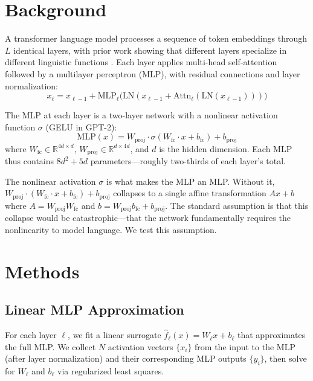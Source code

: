 \documentclass[11pt]{article}
\begin{document}
\section{Background}

A transformer language model processes a sequence of token embeddings through $L$ identical layers, with prior work showing that different layers specialize in different linguistic functions \citep{tenney2019}. Each layer applies multi-head self-attention followed by a multilayer perceptron (MLP), with residual connections and layer normalization:
\begin{equation}
x_\ell = x_{\ell-1} + \mathrm{MLP}_\ell\!\bigl(\mathrm{LN}(x_{\ell-1} + \mathrm{Attn}_\ell(\mathrm{LN}(x_{\ell-1})))\bigr)
\end{equation}

The MLP at each layer is a two-layer network with a nonlinear activation function $\sigma$ (GELU in GPT-2):
\begin{equation}
\mathrm{MLP}(x) = W_{\mathrm{proj}} \cdot \sigma(W_{\mathrm{fc}} \cdot x + b_{\mathrm{fc}}) + b_{\mathrm{proj}}
\end{equation}
where $W_{\mathrm{fc}} \in \mathbb{R}^{4d \times d}$, $W_{\mathrm{proj}} \in \mathbb{R}^{d \times 4d}$, and $d$ is the hidden dimension. Each MLP thus contains $8d^2 + 5d$ parameters---roughly two-thirds of each layer's total.

The nonlinear activation $\sigma$ is what makes the MLP an MLP. Without it, $W_{\mathrm{proj}} \cdot (W_{\mathrm{fc}} \cdot x + b_{\mathrm{fc}}) + b_{\mathrm{proj}}$ collapses to a single affine transformation $Ax + b$ where $A = W_{\mathrm{proj}} W_{\mathrm{fc}}$ and $b = W_{\mathrm{proj}} b_{\mathrm{fc}} + b_{\mathrm{proj}}$. The standard assumption is that this collapse would be catastrophic---that the network fundamentally requires the nonlinearity to model language. We test this assumption.

\section{Methods}

\subsection{Linear MLP Approximation}

For each layer $\ell$, we fit a linear surrogate $\hat{f}_\ell(x) = W_\ell x + b_\ell$ that approximates the full MLP. We collect $N$ activation vectors $\{x_i\}$ from the input to the MLP (after layer normalization) and their corresponding MLP outputs $\{y_i\}$, then solve for $W_\ell$ and $b_\ell$ via regularized least squares.
\end{document}
